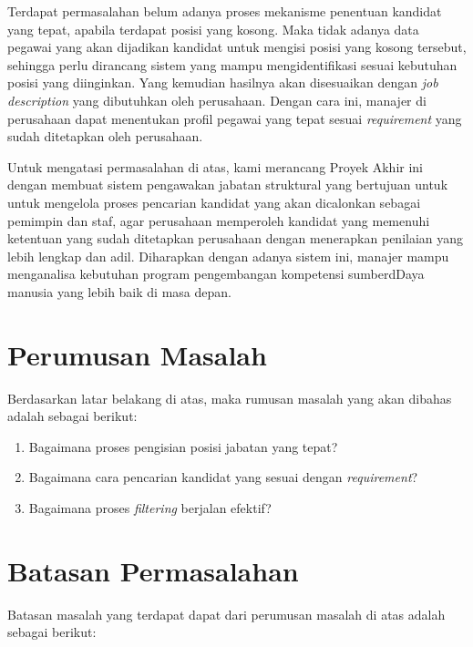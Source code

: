Terdapat permasalahan belum adanya proses mekanisme penentuan kandidat yang tepat, apabila terdapat posisi yang kosong. Maka tidak adanya data pegawai yang akan dijadikan kandidat untuk mengisi posisi yang kosong tersebut, sehingga perlu dirancang sistem yang mampu mengidentifikasi sesuai kebutuhan posisi yang diinginkan. Yang kemudian hasilnya akan disesuaikan dengan \textit{job description} yang dibutuhkan oleh perusahaan. Dengan cara ini, manajer di perusahaan dapat menentukan profil pegawai yang tepat sesuai \textit{requirement} yang sudah ditetapkan oleh perusahaan.

Untuk mengatasi permasalahan di atas, kami merancang Proyek Akhir ini dengan membuat sistem pengawakan jabatan struktural yang bertujuan untuk untuk mengelola proses pencarian kandidat yang akan dicalonkan sebagai pemimpin dan staf, agar perusahaan memperoleh kandidat yang memenuhi ketentuan yang sudah ditetapkan perusahaan dengan menerapkan penilaian yang lebih lengkap dan adil. Diharapkan dengan adanya sistem ini, manajer mampu menganalisa kebutuhan program pengembangan kompetensi sumberdDaya manusia yang lebih baik di masa depan.


\section{Perumusan Masalah}
Berdasarkan latar belakang di atas, maka rumusan masalah yang akan dibahas adalah sebagai berikut:
\begin{enumerate}
\item Bagaimana proses pengisian posisi jabatan yang tepat?
\item Bagaimana cara pencarian kandidat yang sesuai dengan \textit{requirement}?
\item Bagaimana proses \textit{filtering} berjalan efektif?
\end{enumerate}

\section{Batasan Permasalahan}
Batasan masalah yang terdapat dapat dari perumusan masalah di atas adalah sebagai berikut:

